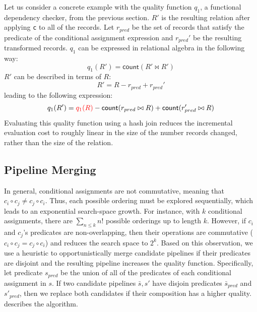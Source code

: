 Let us consider a concrete example with the quality function $q_1$, a functional dependency checker, from the previous section.
$R'$ is the resulting relation after applying \texttt{c} to all of the records.
Let $r_{pred}$ be the set of records that satisfy the predicate of the conditional assignment expression and $r_{pred}'$ be the resulting transformed records.
$q_1$ can be expressed in relational algebra in the following way:
\[
q_1(R') = \textsf{count}( R' \bowtie R' )
\]
$R'$ can be described in terms of $R$:
\[
R' = R - r_{pred} + r_{pred}' 
\]
leading to the following expression:
\[
q_1(R') = \textcolor{red}{q_1(R)} - \textsf{count}( r_{pred} \bowtie R )  + \textsf{count}( r'_{pred} \bowtie R )
\]
Evaluating this quality function using a hash join reduces the incremental evaluation cost to roughly linear in the size of the number records changed, rather than the size of the relation.



\subsection{Pipeline Merging}
In general, conditional assignments are not commutative, meaning that $c_i\circ c_j \ne c_j\circ c_i$.  Thus, each possible ordering must be explored sequentially, which leads to an exponential search-space growth.  For instance, with $k$ conditional assignments, there are $\sum_{n\le k} n!$ possible orderings up to length $k$.  However, if $c_i$ and $c_j$'s predicates are non-overlapping, then their operations are commutative ($c_i\circ c_j = c_j\circ c_i$) and reduces the search space to $2^k$.  Based on this observation, we use a heuristic to opportunistically merge candidate pipelines if their predicates are disjoint and the resulting pipeline increases the quality function.  Specifically, let predicate $s_{pred}$ be the union of all of the predicates of each conditional assignment in $s$.  If two candidate pipelines $\bar{s},s'$ have disjoin predicates $\bar{s}_{pred}$ and $s'_{pred}$, then we replace both candidates if their composition has a higher quality.   describes the algorithm.


